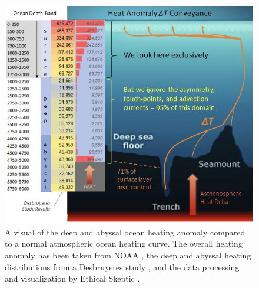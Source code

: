 \documentclass[10pt,twocolumn,letterpaper]{article}
\begin{document}
\begin{figure}[t]
\begin{center}
\includegraphics[width=1\textwidth]{deepsea.jpg}
\end{center}
   \caption{A visual of the deep and abyssal ocean heating anomaly compared to a normal atmospheric ocean heating curve. The overall heating anomaly has been taken from NOAA \cite{147}, the deep and abyssal heating distributions from a Desbruyeres study \cite{132}, and the data processing and visualization by Ethical Skeptic \cite{129}.}
\label{fig:21}
\end{figure}
\end{document}
